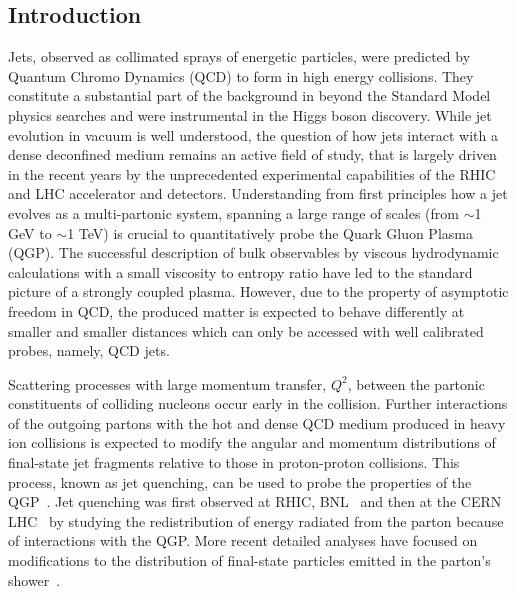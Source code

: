 \subsection{Introduction}
Jets, observed as collimated sprays of energetic particles, were predicted by Quantum Chromo Dynamics (QCD) to form in high energy collisions. They constitute a substantial part of the background in beyond the Standard Model physics searches and were instrumental in the Higgs boson discovery. While jet evolution in vacuum is well understood, the question of how jets interact with a dense deconfined medium remains an active field of study, that is largely driven in the recent years by the unprecedented experimental capabilities of the RHIC and LHC accelerator and detectors.  Understanding from first principles how a jet evolves as a multi-partonic system, spanning a large range of scales (from  $\sim$1 GeV to $\sim$1 TeV) is crucial to quantitatively probe the Quark Gluon Plasma (QGP).  The successful description of bulk observables by viscous hydrodynamic calculations with a small viscosity to entropy ratio have led to the standard picture of a strongly coupled plasma. However, due to the property of asymptotic freedom in QCD, the produced matter is expected to behave differently at smaller and smaller distances which can only be accessed with well calibrated probes, namely, QCD jets.

Scattering processes with large momentum transfer, $Q^{2}$, between the partonic constituents of colliding nucleons occur early in the collision. Further interactions of the outgoing partons with the hot and dense QCD medium produced in heavy ion collisions is expected to modify the angular and momentum distributions of final-state jet fragments relative to those in proton-proton collisions. This process, known as jet quenching, can be used to probe the properties of the QGP~\cite{Bjorken:1982tu,Gyulassy:1990ye,Baier:1994bd,Zakharov:2018rst,Gyulassy:1999zd,Wiedemann:2009sh}. Jet quenching was first observed at RHIC, BNL~\cite{Adcox:2001jp,Adler:2003qi,Adams:2003kv,Arsene:2003yk,Back:2003qr,Adamczyk:2016fqm,Adamczyk:2017yhe} and then at the CERN LHC~\cite{Aamodt:2010jd,Aamodt:2011vg,Aad:2015wga,CMS:2012aa,Aad:2010bu,Chatrchyan:2012nia,Aad:2012vca,Abelev:2013kqa,Adam:2015ewa,Khachatryan:2016odn,Adam:2015doa} by studying the redistribution of energy radiated from the parton because of interactions with the QGP. More recent detailed analyses have focused on modifications to the distribution of final-state particles emitted in the parton's shower~\cite{Chatrchyan:2013kwa,Chatrchyan:2014ava,Aaboud:2017bzv,Acharya:2017goa,Acharya:2018uvf,Sirunyan:2017bsd,Sirunyan:2018gct}.

